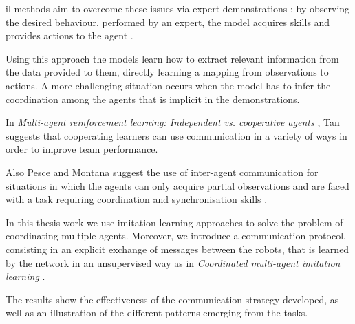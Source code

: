 \gls{il} methods \cite[see][]{schaal1999imitation, stepputtis2019imitation} aim to 
overcome these issues via expert demonstrations \cite[][]{song2018multi}: by 
observing the desired behaviour, performed by an expert, the model acquires 
skills and provides actions to the agent \cite[][]{zhang2018deep, 
billard2008survey}.

Using this approach the models learn how to extract relevant information from 
the data provided to them, directly learning a mapping from observations to 
actions. 
A more challenging situation occurs when the model has to infer the coordination 
among the agents that is implicit in the demonstrations.

In \emph{Multi-agent reinforcement learning: Independent vs. cooperative 
agents} \cite[][]{tan1993multi}, Tan suggests that cooperating learners can use 
communication in a variety of ways in order to improve team performance. 

Also Pesce and Montana suggest the use of inter-agent communication for 
situations in which the agents can only acquire partial observations and are faced 
with a task requiring coordination and synchronisation skills 
\cite[][]{pesce2019improving}.

In this thesis work we use imitation learning approaches to solve the problem of 
coordinating multiple agents. Moreover, we introduce a communication protocol, 
consisting in an explicit exchange of messages between the robots, that is 
learned by the network in an unsupervised way as in \emph{Coordinated 
multi-agent imitation learning} \cite[][]{le2017coordinated}. 

The results show the effectiveness of the communication strategy developed, as 
well as an illustration of the different patterns emerging from the tasks.
